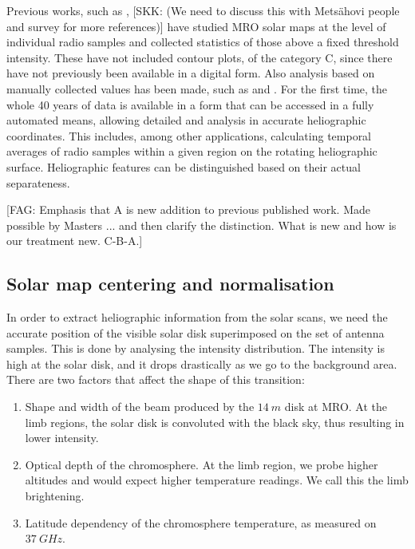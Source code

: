 \documentclass{aa}
\newcommand{\fag}[1]{\textcolor{midpurple}{[FAG: #1]}} %
\newcommand{\skk}[1]{\textcolor{midorange}{[SKK: #1]}} %
\begin{document}
Previous works, such as \cite{metsahovi40}, \skk{(We need to discuss this with Metsähovi people and survey for more 
references)} have studied MRO solar maps at the level of individual radio samples and collected statistics of those 
above a fixed threshold intensity. These have not included contour plots, of the category C, since there have not 
previously been available in a digital form. Also analysis based on manually collected values has been made, such as 
\cite{kallunki_diss} and \cite{valtaoja}. For the first time, the whole 40 years of data is available in a form that can 
be accessed in a fully automated means, allowing detailed and analysis in accurate heliographic coordinates. This 
includes, among other applications, calculating temporal averages of radio samples within a given region on the rotating 
heliographic surface. Heliographic features can be distinguished based on their actual separateness.

\fag{Emphasis that A is new addition to previous published work. Made possible by Masters ...
and then clarify the distinction. What is new and how is our treatment new. C-B-A.}


  \subsection{Solar map centering and normalisation} \label{sect:disk}

In order to extract heliographic information from the solar scans, we need the accurate position of the visible solar disk superimposed on the set of antenna samples. This is done by analysing the intensity distribution. The intensity is high at the solar disk, and it drops drastically as we go to the background area. There are two factors that affect the shape of this transition:
\begin{enumerate}
\item Shape and width of the beam produced by the $\SI{14}{m}$ disk at MRO. At the limb regions, the solar disk is convoluted with the black sky, thus resulting in lower intensity.
\item Optical depth of the chromosphere. At the limb region, we probe higher altitudes and would expect higher temperature readings. We call this the limb brightening.
\item Latitude dependency of the chromosphere temperature, as measured on $\SI{37}{GHz}$.
\end{enumerate}
\end{document}
